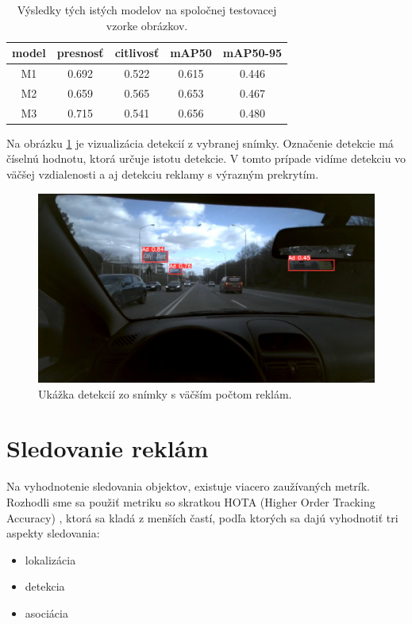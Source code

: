 \begin{table}[ht]
\centering
\begin{tabular}{ |c c c c c|  }
\hline
model & presnosť & citlivosť & mAP50 & mAP50-95 \\
\hline
M1  & 0.692	& 0.522	& 0.615	& 0.446 \\
M2  & 0.659 & 0.565 & 0.653 & 0.467 \\
M3  & 0.715 & 0.541 & 0.656 & 0.480 \\
\hline
\end{tabular}
\caption{Výsledky tých istých modelov na spoločnej testovacej vzorke obrázkov.}
\label{table:test2}
\end{table}

Na obrázku \ref{img:dt7} je vizualizácia detekcií z vybranej snímky. Označenie detekcie má číselnú hodnotu, ktorá určuje istotu detekcie. V tomto prípade vidíme detekciu vo väčšej vzdialenosti a aj detekciu reklamy s výrazným prekrytím.

\begin{figure}[ht]
    \centering
    \includegraphics[width=1\textwidth]{images/05/120.jpg}
    \caption{Ukážka detekcií zo snímky s väčším počtom reklám.}
    \label{img:dt7}
\end{figure}

\section{Sledovanie reklám}

Na vyhodnotenie sledovania objektov, existuje viacero zaužívaných metrík. Rozhodli sme sa použiť metriku so skratkou HOTA (Higher Order Tracking Accuracy) \cite{hota}, ktorá sa kladá z menších častí, podľa ktorých sa dajú vyhodnotiť tri aspekty sledovania:

\begin{itemize}
    \item lokalizácia
    \item detekcia
    \item asociácia
\end{itemize}

